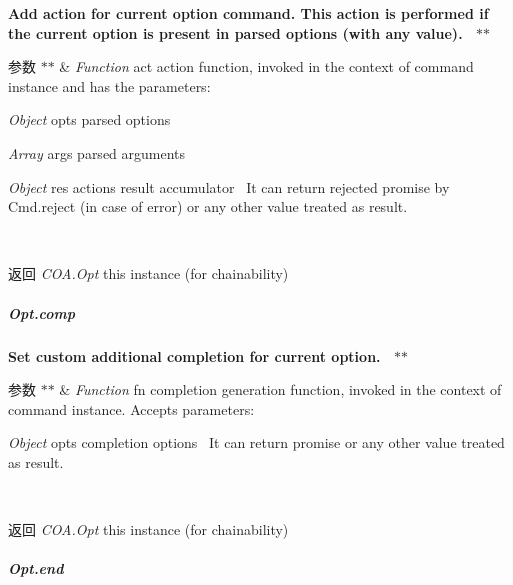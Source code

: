 {\bfseries {\bfseries {\bfseries {\bfseries {\bfseries {\bfseries  Add action for current option command. This action is performed if the current option is present in parsed options (with any value).~\newline
 $\ast$$\ast$
\begin{DoxyParams}{参数}
{\em $\ast$$\ast$} & {\itshape Function} {\ttfamily act} action function, invoked in the context of command instance and has the parameters\+:~\newline

\begin{DoxyItemize}
\item {\itshape Object} {\ttfamily opts} parsed options~\newline

\item {\itshape Array} {\ttfamily args} parsed arguments~\newline

\item {\itshape Object} {\ttfamily res} actions result accumulator~\newline
 It can return rejected promise by Cmd.\+reject (in case of error) or any other value treated as result.~\newline
 {\bfseries }
\end{DoxyItemize}\\
\hline
\end{DoxyParams}
\begin{DoxyReturn}{返回}
{\bfseries } {\itshape C\+O\+A.\+Opt} {\ttfamily this} instance (for chainability)
\end{DoxyReturn}
\subparagraph*{Opt.\+comp}}}}}}}

{\bfseries {\bfseries {\bfseries {\bfseries {\bfseries {\bfseries  Set custom additional completion for current option.~\newline
 $\ast$$\ast$
\begin{DoxyParams}{参数}
{\em $\ast$$\ast$} & {\itshape Function} {\ttfamily fn} completion generation function, invoked in the context of command instance. Accepts parameters\+:~\newline

\begin{DoxyItemize}
\item {\itshape Object} {\ttfamily opts} completion options~\newline
 It can return promise or any other value treated as result.~\newline
 {\bfseries }
\end{DoxyItemize}\\
\hline
\end{DoxyParams}
\begin{DoxyReturn}{返回}
{\bfseries } {\itshape C\+O\+A.\+Opt} {\ttfamily this} instance (for chainability)
\end{DoxyReturn}
\subparagraph*{Opt.\+end}}}}}}}

